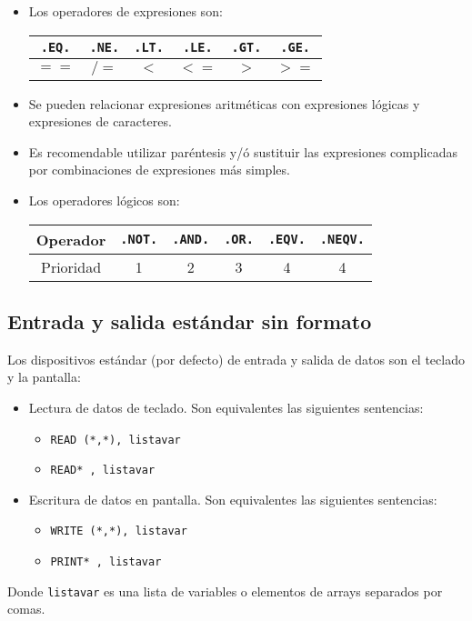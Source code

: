 \begin{itemize}
	\item Los operadores de expresiones son:
	      \begin{table}[h!] \centering
		      \begin{tabular}{|c|c|c|c|c|c|}
			      \hline
			      {\tt .EQ.} & {\tt .NE.} & {\tt .LT.} & {\tt .LE.} & {\tt .GT.} & {\tt .GE.} \\ \hline
			      $==$       & $/=$       & $<$        & $<=$       & $>$        & $>=$       \\    \hline
		      \end{tabular}
	      \end{table}

	\item Se pueden relacionar expresiones aritméticas con expresiones lógicas y expresiones de caracteres.
	\item Es recomendable utilizar paréntesis y/ó sustituir las expresiones complicadas por combinaciones de expresiones más simples.
	\item Los operadores lógicos son:
	      \begin{table}[h!] \centering
		      \begin{tabular}{|c|c|c|c|c|c|}
			      \hline  Operador & {\tt .NOT.} & {\tt .AND.} & {\tt .OR.} & {\tt .EQV.} & {\tt .NEQV.} \\ \hline Prioridad
			                       & 1           & 2           & 3          & 4           & 4            \\    \hline
		      \end{tabular}
	      \end{table}
\end{itemize}

\subsection{Entrada y salida estándar sin formato}


Los dispositivos estándar (por defecto) de entrada y salida de datos son el teclado y la pantalla:

\begin{itemize}
	\item Lectura de datos de teclado. Son equivalentes las siguientes sentencias:
	      \begin{itemize}
		      \item {\tt READ (*,*), listavar}
		      \item {\tt READ* , listavar}
	      \end{itemize}

	\item Escritura de datos en pantalla. Son equivalentes las siguientes sentencias:
	      \begin{itemize}
		      \item {\tt WRITE (*,*), listavar}
		      \item {\tt PRINT* , listavar}
	      \end{itemize}
\end{itemize}
Donde {\tt listavar} es una lista de variables o elementos de arrays separados por comas.

